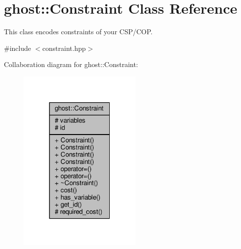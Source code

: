 \hypertarget{classghost_1_1Constraint}{}\section{ghost\+:\+:Constraint Class Reference}
\label{classghost_1_1Constraint}


This class encodes constraints of your C\+S\+P/\+C\+OP.  




{\ttfamily \#include $<$constraint.\+hpp$>$}



Collaboration diagram for ghost\+:\+:Constraint\+:
\nopagebreak
\begin{figure}[H]
\begin{center}
\leavevmode
\includegraphics[width=172pt]{classghost_1_1Constraint__coll__graph}
\end{center}
\end{figure}
